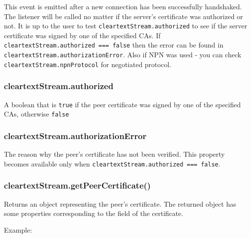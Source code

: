 This event is emitted after a new connection has been successfully
handshaked. The listener will be called no matter if the server's
certificate was authorized or not. It is up to the user to test
\texttt{cleartextStream.authorized} to see if the server certificate was
signed by one of the specified CAs. If
\texttt{cleartextStream.authorized === false} then the error can be
found in \texttt{cleartextStream.authorizationError}. Also if NPN was
used - you can check \texttt{cleartextStream.npnProtocol} for negotiated
protocol.

\subsubsection{cleartextStream.authorized}

A boolean that is \texttt{true} if the peer certificate was signed by
one of the specified CAs, otherwise \texttt{false}

\subsubsection{cleartextStream.authorizationError}

The reason why the peer's certificate has not been verified. This
property becomes available only when
\texttt{cleartextStream.authorized === false}.

\subsubsection{cleartextStream.getPeerCertificate()}

Returns an object representing the peer's certificate. The returned
object has some properties corresponding to the field of the
certificate.

Example:

